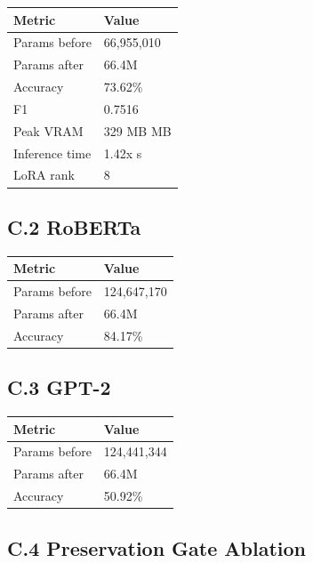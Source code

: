 \begin{table}[H]
\centering
\small
\begin{tabular}{ll}
\toprule
\textbf{Metric} & \textbf{Value} \\
\midrule
Params before & 66,955,010 \\
Params after & 66.4M \\
Accuracy & 73.62\% \\
F1 & 0.7516 \\
Peak VRAM & 329 MB MB \\
Inference time & 1.42x s \\
LoRA rank & 8 \\
\bottomrule
\end{tabular}
\end{table}

\subsection{C.2 RoBERTa}

\begin{table}[H]
\centering
\small
\begin{tabular}{ll}
\toprule
\textbf{Metric} & \textbf{Value} \\
\midrule
Params before & 124,647,170 \\
Params after & 66.4M \\
Accuracy & 84.17\% \\
\bottomrule
\end{tabular}
\end{table}

\subsection{C.3 GPT-2}

\begin{table}[H]
\centering
\small
\begin{tabular}{ll}
\toprule
\textbf{Metric} & \textbf{Value} \\
\midrule
Params before & 124,441,344 \\
Params after & 66.4M \\
Accuracy & 50.92\% \\
\bottomrule
\end{tabular}
\end{table}

\subsection{C.4 Preservation Gate Ablation}

